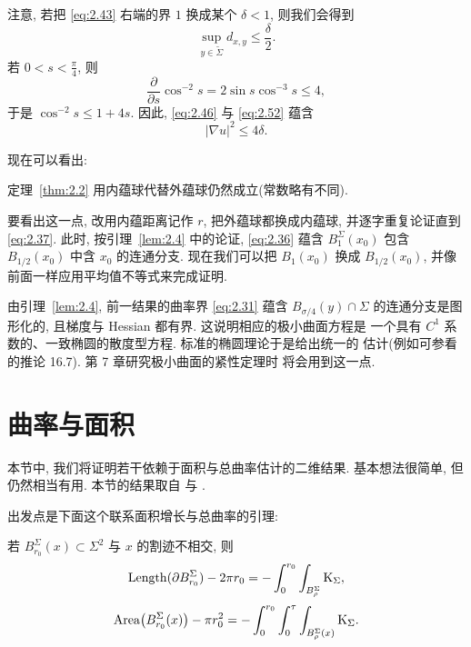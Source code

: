 注意, 若把 \eqref{eq:2.43} 右端的界 $1$ 换成某个 $\delta<1$, 则我们会得到
\begin{equation}
\sup_{y\in\tilde\Sigma}d_{x,y}\leq\frac{\delta}{2}.
\label{eq:2.52}
\end{equation}
若 $0<s<\frac{\pi}{4}$, 则
\begin{equation}
\frac{\partial}{\partial s}\cos^{-2}s=2\sin s\cos^{-3}s\leq4,
\label{eq:2.53}
\end{equation}
于是 $\cos^{-2}s\leq1+4s$. 因此, \eqref{eq:2.46} 与 \eqref{eq:2.52} 蕴含
\begin{equation}
|\nabla u|^{2}\leq4\delta.
\label{eq:2.54}
\end{equation}

现在可以看出:

\begin{remark}
\label{rem:2.5}
定理~\ref{thm:2.2} 用内蕴球代替外蕴球仍然成立(常数略有不同).
\end{remark}

要看出这一点, 改用内蕴距离记作 $r$, 把外蕴球都换成内蕴球, 并逐字重复论证直到
\eqref{eq:2.37}. 此时, 按引理~\ref{lem:2.4} 中的论证, \eqref{eq:2.36} 蕴含 $B_1^{\Sigma}(x_0)$
包含 $B_{1/2}(x_0)$ 中含 $x_0$ 的连通分支. 现在我们可以把 $B_1(x_0)$ 换成
$B_{1/2}(x_0)$, 并像前面一样应用平均值不等式来完成证明.

由引理~\ref{lem:2.4}, 前一结果的曲率界 \eqref{eq:2.31} 蕴含 $B_{\sigma/4}(y)\cap\Sigma$
的连通分支是图形化的, 且梯度与 Hessian 都有界. 这说明相应的极小曲面方程是
一个具有 $C^{1}$ 系数的、一致椭圆的散度型方程. 标准的椭圆理论于是给出统一的
估计(例如可参看 \cite{GiTr} 的推论 16.7). 第 7 章研究极小曲面的紧性定理时
将会用到这一点.

\section{曲率与面积}
\label{sec:2.3}

本节中, 我们将证明若干依赖于面积与总曲率估计的二维结果. 基本想法很简单, 但
仍然相当有用. 本节的结果取自 \cite{CM2} 与 \cite{CM4}.

出发点是下面这个联系面积增长与总曲率的引理:

\begin{lemma}
\label{lem:2.6}
若 $B_{r_0}^{\Sigma}(x)\subset\Sigma^2$ 与 $x$ 的割迹不相交, 则
\begin{equation}
\operatorname{Length}(\partial B_{r_0}^{\Sigma})-2\pi r_0
 =-\int_0^{r_0}\int_{B_\rho^{\Sigma}}\mathrm{K}_{\Sigma},
\label{eq:2.55}
\end{equation}
\begin{equation}
\operatorname{Area}\bigl(B_{r_0}^{\Sigma}(x)\bigr)-\pi r_0^{2}
 =-\int_0^{r_0}\int_0^{\tau}\int_{B_\rho^{\Sigma}(x)}\mathrm{K}_{\Sigma}.
\label{eq:2.56}
\end{equation}
\end{lemma}

